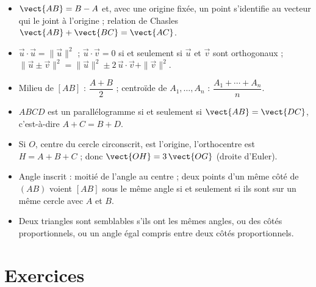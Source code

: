 \documentclass[11pt]{article}
\begin{document}
\begin{retenir}
\begin{itemize}
  \item $\vect{AB}=B-A$ et, avec une origine fixée, un point s'identifie au vecteur qui le joint à l'origine ; relation de Chasles $\vect{AB}+\vect{BC}=\vect{AC}$.
  \item $\vec{u}\cdot\vec{u}=\|\vec{u}\|^2$ ; $\vec{u}\cdot\vec{v}=0$ si et seulement si $\vec{u}$ et $\vec{v}$ sont orthogonaux ; $\|\vec{u}\pm\vec{v}\|^2=\|\vec{u}\|^2\pm2\,\vec{u}\cdot\vec{v}+\|\vec{v}\|^2$.
  \item Milieu de $[AB]$ : $\dfrac{A+B}{2}$ ; centroïde de $A_1,\ldots,A_n$ : $\dfrac{A_1+\cdots+A_n}{n}$.
  \item $ABCD$ est un parallélogramme si et seulement si $\vect{AB}=\vect{DC}$, c'est-à-dire $A+C=B+D$.
  \item Si $O$, centre du cercle circonscrit, est l'origine, l'orthocentre est $H=A+B+C$ ; donc $\vect{OH}=3\,\vect{OG}$ (droite d'Euler).
  \item Angle inscrit : moitié de l'angle au centre ; deux points d'un même côté de $(AB)$ voient $[AB]$ sous le même angle si et seulement si ils sont sur un même cercle avec $A$ et $B$.
  \item Deux triangles sont semblables s'ils ont les mêmes angles, ou des côtés proportionnels, ou un angle égal compris entre deux côtés proportionnels.
\end{itemize}
\end{retenir}

\section{Exercices}\label{sec:exercices}







\end{document}
